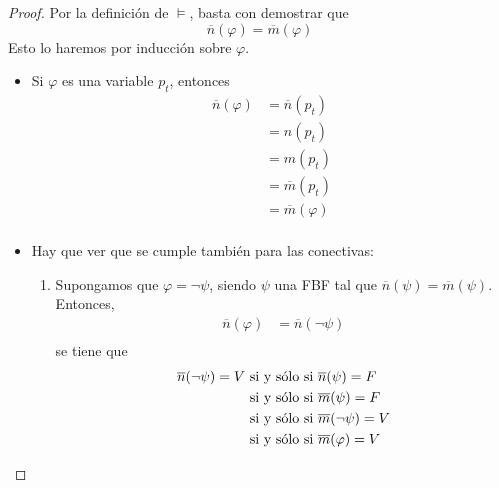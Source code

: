 \documentclass[12pt]{report}
\theoremstyle{largebreak}
\begin{document}
    \begin{proof}
        Por la definición de $\vDash$, basta con demostrar que
        \begin{equation*}
            \overline{n}(\varphi)=\overline{m}(\varphi)
        \end{equation*}
        Esto lo haremos por inducción sobre $\varphi$.
        \begin{itemize}
            \item Si $\varphi$ es una variable $p_t$, entonces
            \begin{equation*}
                \begin{split}
                    \overline{n}(\varphi)&=\overline{n}(p_t)\\
                    &=n(p_t)\\
                    &=m(p_t)\\
                    &=\overline{m}(p_t)\\
                    &=\overline{m}(\varphi)\\
                \end{split}
            \end{equation*}
            \item Hay que ver que se cumple también para las conectivas:
            \begin{enumerate}
                \item Supongamos que $\varphi=\neg\psi$, siendo $\psi$ una FBF tal que $\overline{n}(\psi)=\overline{m}(\psi)$. Entonces,
                \begin{equation*}
                    \begin{split}
                        \overline{n}(\varphi)&=\overline{n}(\neg\psi)\\
                    \end{split}
                \end{equation*}
                se tiene que
                \begin{equation*}
                    \begin{split}
                        \overline{n}(\neg\psi)=V&\textup{ si y sólo si } \overline{n}(\psi)=F\\
                        &\textup{ si y sólo si } \overline{m}(\psi)=F\\
                        &\textup{ si y sólo si } \overline{m}(\neg\psi)=V\\
                        &\textup{ si y sólo si } \overline{m}(\varphi)=V\\

\end{split}
\end{equation*}
\end{enumerate}
\end{itemize}
\end{proof}
\end{document}
